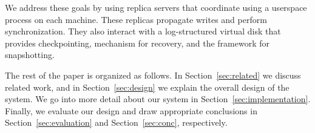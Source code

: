We address these goals by using replica servers that coordinate using a
userspace process on each machine. These replicas propagate writes and 
perform synchronization. They also interact with a log-structured virtual 
disk that provides checkpointing, mechanism for recovery, and the 
framework for snapshotting. 


The rest of the paper is organized as follows. In Section~\ref{sec:related}
we discuss related work, and in Section~\ref{sec:design} we explain the 
overall design of the system. We go into more detail about our system in 
Section~\ref{sec:implementation}. Finally, we evaluate our design and draw
appropriate conclusions in Section~\ref{sec:evaluation} and 
Section~\ref{sec:conc}, respectively.
